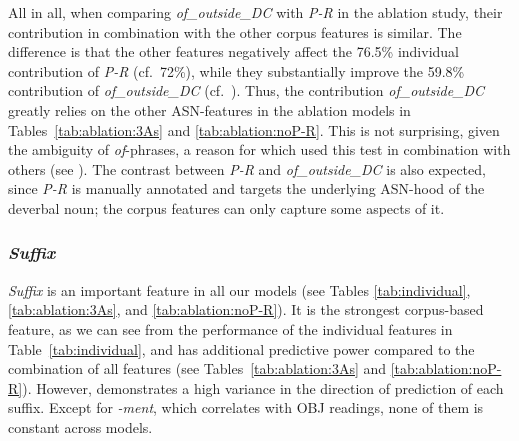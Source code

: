 \documentclass[output=paper]{langsci/langscibook}
\begin{document}
All in all, when comparing \textit{of\_outside\_DC} with \textit{P-R} in the ablation study, their contribution in combination with the other corpus features is similar.  {The difference is that the other features negatively affect the  76.5\% individual contribution  of \textit{P-R} (cf.\ 72\%), while they substantially improve the 59.8\% contribution of \textit{of\_outside\_DC} (cf.\ ).} Thus, the  contribution \textit{of\_outside\_DC}  greatly relies on the other ASN-features in the ablation models in Tables~\ref{tab:ablation:3As} and \ref{tab:ablation:noP-R}. This is not surprising, given the ambiguity of \textit{of}-phrases, a reason for which \cite{grimshaw:90} used this test in combination with others (see ). The contrast between \textit{P-R} and \textit{of\_outside\_DC} is also expected, since \textit{P-R} is manually annotated and targets the underlying ASN-hood of the deverbal noun; the corpus features can only capture some aspects of it.






\subsubsection{\textit{Suffix}}\label{sec:discussion-int-suffix}
\textit{Suffix} is an important feature in all our models (see Tables \ref{tab:individual}, \ref{tab:ablation:3As}, and \ref{tab:ablation:noP-R}).  {It is the strongest corpus-based feature, as we can see from the performance of the individual features in Table~\ref{tab:individual}, and has additional predictive power compared to the combination of all features}  {(see Tables~\ref{tab:ablation:3As} and \ref{tab:ablation:noP-R}).} However,  demonstrates a high variance in the direction of prediction of each suffix.  {Except for \textit{-ment}, which correlates with OBJ readings,} none of them is constant across models. 
\end{document}
